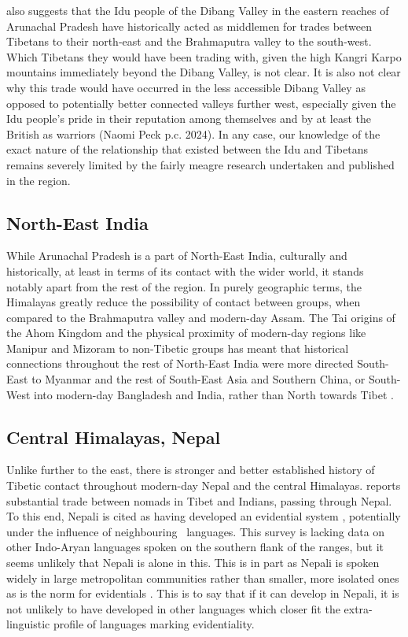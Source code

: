  also suggests that the Idu people of the Dibang Valley in the eastern reaches of Arunachal Pradesh have historically acted as middlemen for trades between Tibetans to their north-east and the Brahmaputra valley to the south-west. Which Tibetans they would have been trading with, given the high Kangri Karpo mountains immediately beyond the Dibang Valley, is not clear. It is also not clear why this trade would have occurred in the less accessible Dibang Valley as opposed to potentially better connected valleys further west, especially given the Idu people's pride in their reputation among themselves and by at least the British as warriors (Naomi Peck p.c. 2024). In any case, our knowledge of the exact nature of the relationship that existed between the Idu and Tibetans remains severely limited by the fairly meagre research undertaken and published in the region.


\subsection{North-East India}
While Arunachal Pradesh is a part of North-East India, culturally and historically, at least in terms of its contact with the wider world, it stands notably apart from the rest of the region. In purely geographic terms, the Himalayas greatly reduce the possibility of contact between groups, when compared to the Brahmaputra valley and modern-day Assam. The Tai origins of the Ahom Kingdom and the physical proximity of modern-day regions like Manipur and Mizoram to non-Tibetic groups has meant that historical connections throughout the rest of North-East India were more directed South-East to Myanmar and the rest of South-East Asia and Southern China, or South-West into modern-day Bangladesh and India, rather than North towards Tibet \cite{Gogoi1968}.

\subsection{Central Himalayas, Nepal}
Unlike further to the east, there is stronger and better established history of Tibetic contact throughout modern-day Nepal and the central Himalayas.  reports substantial trade between nomads in Tibet and Indians, passing through Nepal. To this end, Nepali is cited as having developed an evidential system \cite{Bashir2006}, potentially under the influence of neighbouring \lfam\ languages. This survey is lacking data on other Indo-Aryan languages spoken on the southern flank of the ranges, but it seems unlikely that Nepali is alone in this. This is in part as Nepali is spoken widely in large metropolitan communities rather than smaller, more isolated ones as is the norm for evidentials \cite[359]{Aikhenvald2004}. This is to say that if it can develop in Nepali, it is not unlikely to have developed in other languages which closer fit the extra-linguistic profile of languages marking evidentiality.

